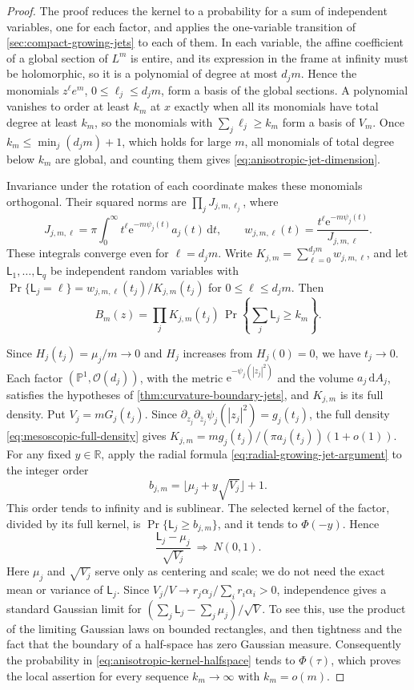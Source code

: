 \begin{proof}
The proof reduces the kernel to a probability for a sum of independent variables, one for each factor, and applies the one-variable transition of \cref{sec:compact-growing-jets} to each of them. In each variable, the affine coefficient of a global section of $L^m$ is entire, and its expression in the frame at infinity must be holomorphic, so it is a polynomial of degree at most $d_jm$. Hence the monomials $z^\ell e^m$, $0\leq\ell_j\leq d_jm$, form a basis of the global sections. A polynomial vanishes to order at least $k_m$ at $x$ exactly when all its monomials have total degree at least $k_m$, so the monomials with $\sum_j\ell_j\geq k_m$ form a basis of $V_m$. Once $k_m\leq\min_j(d_jm)+1$, which holds for large $m$, all monomials of total degree below $k_m$ are global, and counting them gives \eqref{eq:anisotropic-jet-dimension}.

Invariance under the rotation of each coordinate makes these monomials orthogonal. Their squared norms are $\prod_jJ_{j,m,\ell_j}$, where
\[
 J_{j,m,\ell}=\pi\int_0^\infty t^\ell\mathrm e^{-m\psi_j(t)}a_j(t)\,\mathrm dt,
 \qquad
 w_{j,m,\ell}(t)=\frac{t^\ell\mathrm e^{-m\psi_j(t)}}{J_{j,m,\ell}}.
\]
These integrals converge even for $\ell=d_jm$. Write $K_{j,m}=\sum_{\ell=0}^{d_jm}w_{j,m,\ell}$, and let $\mathsf L_1,\ldots,\mathsf L_q$ be independent random variables with $\Pr\{\mathsf L_j=\ell\}=w_{j,m,\ell}(t_j)/K_{j,m}(t_j)$ for $0\leq\ell\leq d_jm$. Then
\begin{equation}\label{eq:anisotropic-kernel-halfspace}
 B_m(z)=\prod_jK_{j,m}(t_j)\,
             \Pr\left\{\sum_j\mathsf L_j\geq k_m\right\}.
\end{equation}

Since $H_j(t_j)=\mu_j/m\to0$ and $H_j$ increases from $H_j(0)=0$, we have $t_j\to0$. Each factor $(\mathbb P^1,\mathcal O(d_j))$, with the metric $\mathrm e^{-\psi_j(|z_j|^2)}$ and the volume $a_j\,\mathrm dA_j$, satisfies the hypotheses of \cref{thm:curvature-boundary-jets}, and $K_{j,m}$ is its full density. Put $V_j=mG_j(t_j)$. Since $\partial_{z_j}\partial_{\bar z_j}\psi_j(|z_j|^2)=g_j(t_j)$, the full density \eqref{eq:mesoscopic-full-density} gives $K_{j,m}=mg_j(t_j)/(\pi a_j(t_j))(1+o(1))$. For any fixed $y\in\mathbb R$, apply the radial formula \eqref{eq:radial-growing-jet-argument} to the integer order
\[
 b_{j,m}=\lfloor\mu_j+y\sqrt{V_j}\rfloor+1.
\]
This order tends to infinity and is sublinear. The selected kernel of the factor, divided by its full kernel, is $\Pr\{\mathsf L_j\geq b_{j,m}\}$, and it tends to $\Phi(-y)$. Hence
\[
 \frac{\mathsf L_j-\mu_j}{\sqrt{V_j}}\ \Longrightarrow\ N(0,1).
\]
Here $\mu_j$ and $\sqrt{V_j}$ serve only as centering and scale; we do not need the exact mean or variance of $\mathsf L_j$. Since $V_j/V\to r_j\alpha_j/\sum_i r_i\alpha_i>0$, independence gives a standard Gaussian limit for $(\sum_j\mathsf L_j-\sum_j\mu_j)/\sqrt V$. To see this, use the product of the limiting Gaussian laws on bounded rectangles, and then tightness and the fact that the boundary of a half-space has zero Gaussian measure. Consequently the probability in \eqref{eq:anisotropic-kernel-halfspace} tends to $\Phi(\tau)$, which proves the local assertion for every sequence $k_m\to\infty$ with $k_m=o(m)$.


\end{proof}
